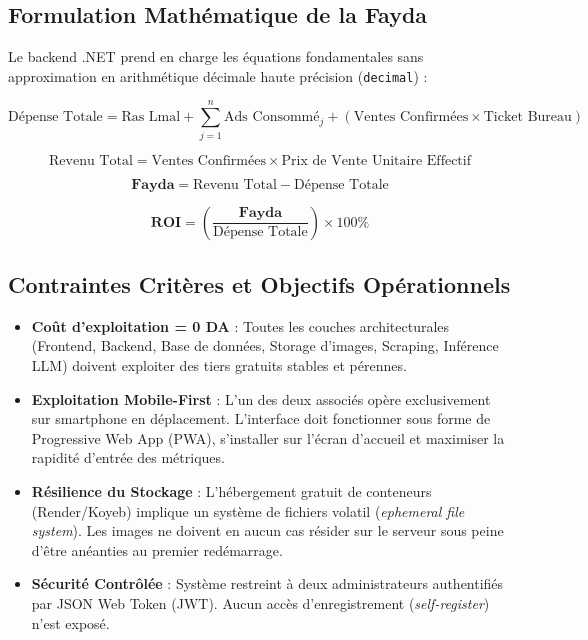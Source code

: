 \documentclass[11pt,a4paper]{article}
\begin{document}
\subsection{Formulation Mathématique de la Fayda}
Le backend .NET prend en charge les équations fondamentales sans approximation en arithmétique décimale haute précision (\texttt{decimal}) :

\begin{equation}
    \text{Dépense Totale} = \text{Ras Lmal} + \sum_{j=1}^{n} \text{Ads Consommé}_j + (\text{Ventes Confirmées} \times \text{Ticket Bureau})
\end{equation}

\begin{equation}
    \text{Revenu Total} = \text{Ventes Confirmées} \times \text{Prix de Vente Unitaire Effectif}
\end{equation}

\begin{equation}
    \mathbf{Fayda} = \text{Revenu Total} - \text{Dépense Totale}
\end{equation}

\begin{equation}
    \mathbf{ROI} = \left( \frac{\mathbf{Fayda}}{\text{Dépense Totale}} \right) \times 100\%
\end{equation}

\subsection{Contraintes Critères et Objectifs Opérationnels}
\begin{itemize}[leftmargin=*]
    \item \textbf{Coût d'exploitation = 0 DA} : Toutes les couches architecturales (Frontend, Backend, Base de données, Storage d'images, Scraping, Inférence LLM) doivent exploiter des tiers gratuits stables et pérennes.
    \item \textbf{Exploitation Mobile-First} : L'un des deux associés opère exclusivement sur smartphone en déplacement. L'interface doit fonctionner sous forme de Progressive Web App (PWA), s'installer sur l'écran d'accueil et maximiser la rapidité d'entrée des métriques.
    \item \textbf{Résilience du Stockage} : L'hébergement gratuit de conteneurs (Render/Koyeb) implique un système de fichiers volatil (\textit{ephemeral file system}). Les images ne doivent en aucun cas résider sur le serveur sous peine d'être anéanties au premier redémarrage.
    \item \textbf{Sécurité Contrôlée} : Système restreint à deux administrateurs authentifiés par JSON Web Token (JWT). Aucun accès d'enregistrement (\textit{self-register}) n'est exposé.
\end{itemize}
\end{document}
